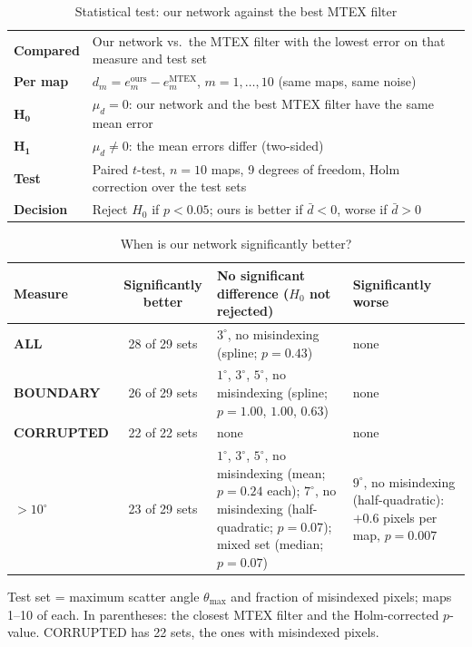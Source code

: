 \documentclass[11pt]{article}
\begin{document}
\begin{table}[h]
\centering
\caption{Statistical test: our network against the best MTEX filter}
\begin{tabular}{>{\bfseries}l p{16cm}}
\toprule
Compared & Our network vs.\ the MTEX filter with the lowest error on that measure and test set \\
Per map  & $d_m = e_m^{\text{ours}} - e_m^{\text{MTEX}}$, \quad $m = 1, \dots, 10$ \quad (same maps, same noise) \\
$\boldsymbol{H_0}$ & $\mu_d = 0$: our network and the best MTEX filter have the same mean error \\
$\boldsymbol{H_1}$ & $\mu_d \neq 0$: the mean errors differ (two-sided) \\
Test     & Paired $t$-test, $n = 10$ maps, 9 degrees of freedom, Holm correction over the test sets \\
Decision & Reject $H_0$ if $p < 0.05$; ours is better if $\bar{d} < 0$, worse if $\bar{d} > 0$ \\
\bottomrule
\end{tabular}
\end{table}

\vspace{1cm}

\begin{table}[h]
\centering
\caption{When is our network significantly better?}
\begin{tabular}{>{\bfseries}l c p{10.2cm} p{5.2cm}}
\toprule
Measure & \textbf{Significantly better} & \textbf{No significant difference ($H_0$ not rejected)} & \textbf{Significantly worse} \\
\midrule
ALL           & 28 of 29 sets & $3^\circ$, no misindexing (spline; $p = 0.43$) & none \\
BOUNDARY      & 26 of 29 sets & $1^\circ$, $3^\circ$, $5^\circ$, no misindexing (spline; $p = 1.00$, $1.00$, $0.63$) & none \\
CORRUPTED     & 22 of 22 sets & none & none \\
${>}10^\circ$ & 23 of 29 sets & $1^\circ$, $3^\circ$, $5^\circ$, no misindexing (mean; $p = 0.24$ each); \newline
                                $7^\circ$, no misindexing (half-quadratic; $p = 0.07$); \newline
                                mixed set (median; $p = 0.07$)
                              & $9^\circ$, no misindexing (half-quadratic): $+0.6$ pixels per map, $p = 0.007$ \\
\bottomrule
\end{tabular}

\vspace{6pt}
{\small Test set = maximum scatter angle $\theta_{\max}$ and fraction of misindexed pixels; maps 1--10 of each.
In parentheses: the closest MTEX filter and the Holm-corrected $p$-value.
CORRUPTED has 22 sets, the ones with misindexed pixels.}
\end{table}
\end{document}
